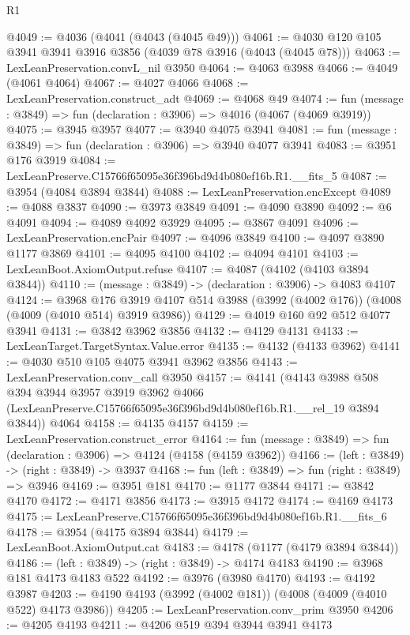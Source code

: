 \begin{lexlean}{R1}
\begin{coremodule}
@4049 := @4036 (@4041 (@4043 (@4045 @49)))
@4061 := @4030 @120 @105 @3941 @3941 @3916 @3856 (@4039 @78 @3916 (@4043 (@4045 @78)))
@4063 := LexLeanPreservation.convL_nil @3950
@4064 := @4063 @3988
@4066 := @4049 (@4061 @4064)
@4067 := @4027 @4066
@4068 := LexLeanPreservation.construct_adt
@4069 := @4068 @49
@4074 := fun (message : @3849) => fun (declaration : @3906) => @4016 (@4067 (@4069 @3919))
@4075 := @3945 @3957
@4077 := @3940 @4075 @3941
@4081 := fun (message : @3849) => fun (declaration : @3906) => @3940 @4077 @3941
@4083 := @3951 @176 @3919
@4084 := LexLeanPreserve.C15766f65095e36f396bd9d4b080ef16b.R1.__fits_5
@4087 := @3954 (@4084 @3894 @3844)
@4088 := LexLeanPreservation.encExcept
@4089 := @4088 @3837
@4090 := @3973 @3849
@4091 := @4090 @3890
@4092 := @6 @4091
@4094 := @4089 @4092 @3929
@4095 := @3867 @4091
@4096 := LexLeanPreservation.encPair
@4097 := @4096 @3849
@4100 := @4097 @3890 @1177 @3869
@4101 := @4095 @4100
@4102 := @4094 @4101
@4103 := LexLeanBoot.AxiomOutput.refuse
@4107 := @4087 (@4102 (@4103 @3894 @3844))
@4110 := (message : @3849) -> (declaration : @3906) -> @4083 @4107
@4124 := @3968
    @176
    @3919
    @4107
    @514
    @3988
    (@3992 (@4002 @176))
    (@4008 (@4009 (@4010 @514) @3919 @3986))
@4129 := @4019 @160 @92 @512 @4077 @3941
@4131 := @3842 @3962 @3856
@4132 := @4129 @4131
@4133 := LexLeanTarget.TargetSyntax.Value.error
@4135 := @4132 (@4133 @3962)
@4141 := @4030 @510 @105 @4075 @3941 @3962 @3856
@4143 := LexLeanPreservation.conv_call @3950
@4157 := @4141
    (@4143
      @3988
      @508
      @394
      @3944
      @3957
      @3919
      @3962
      @4066
      (LexLeanPreserve.C15766f65095e36f396bd9d4b080ef16b.R1.__rel_19 @3894 @3844))
    @4064
@4158 := @4135 @4157
@4159 := LexLeanPreservation.construct_error
@4164 := fun (message : @3849) => fun (declaration : @3906) => @4124 (@4158 (@4159 @3962))
@4166 := (left : @3849) -> (right : @3849) -> @3937
@4168 := fun (left : @3849) => fun (right : @3849) => @3946
@4169 := @3951 @181
@4170 := @1177 @3844
@4171 := @3842 @4170
@4172 := @4171 @3856
@4173 := @3915 @4172
@4174 := @4169 @4173
@4175 := LexLeanPreserve.C15766f65095e36f396bd9d4b080ef16b.R1.__fits_6
@4178 := @3954 (@4175 @3894 @3844)
@4179 := LexLeanBoot.AxiomOutput.cat
@4183 := @4178 (@1177 (@4179 @3894 @3844))
@4186 := (left : @3849) -> (right : @3849) -> @4174 @4183
@4190 := @3968 @181 @4173 @4183 @522
@4192 := @3976 (@3980 @4170)
@4193 := @4192 @3987
@4203 := @4190 @4193 (@3992 (@4002 @181)) (@4008 (@4009 (@4010 @522) @4173 @3986))
@4205 := LexLeanPreservation.conv_prim @3950
@4206 := @4205 @4193
@4211 := @4206 @519 @394 @3944 @3941 @4173

\end{coremodule}
\end{lexlean}
